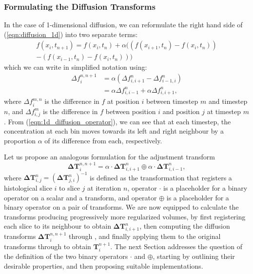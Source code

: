     \subsubsection{Formulating the Diffusion Transforms} %
    \label{ssub:formulating_the_diffusion_transforms}
      In the case of 1-dimensional diffusion, we can reformulate the right hand side of (\ref{eqn:diffusion_1d}) into two separate terms:
      \begin{equation}
        \begin{aligned}
          f(x_i, t_{n+1}) = f(x_i, t_n) + \alpha ((f(x_{i+1}, t_n) - f(x_i, t_n)) \\
          - (f(x_{i-1}, t_n) - f(x_i, t_n))) \label{eqn:1d_diffusion_operator}
        \end{aligned}
  	  \end{equation} 
  	  which we can write in simplified notation using:
      \begin{equation}
        \begin{aligned}
          \Delta f_i^{n,n+1} &= \alpha (\Delta f_{i,i+1}^n - \Delta f_{i-1,i}^n) \\
                             &= \alpha \Delta f_{i,i-1}^n + \alpha \Delta f_{i,i+1}^n, \label{eqn:simplified_expressions}
        \end{aligned}
      \end{equation}
      where $\Delta f_i^{m,n}$ is the difference in $f$ at position $i$ between timestep $m$ and timestep $n$, and $\Delta f_{i,j}^m$ is the difference in $f$ between position $i$ and position $j$ at timestep $m$. From (\ref{eqn:1d_diffusion_operator}), we can see that at each timestep, the concentration at each bin moves towards its left and right neighbour by a proportion $\alpha$ of its difference from each, respectively.
		
      Let us propose an analogous formulation for the adjustment transform
      \begin{equation}
        \mathbf{\Delta T}_i^{n,n+1} = \alpha \cdot \mathbf{\Delta T}_{i,i+1}^n \oplus \alpha \cdot \mathbf{\Delta T}_{i,i-1}^n, \label{eqn:transformational_placeholder}
      \end{equation}
      where $\mathbf{\Delta T}_{i,j}^n = (\mathbf{\Delta T}_{j,i}^n)^{-1}$ is defined as the transformation that registers a histological slice $i$ to slice $j$ at iteration $n$, operator $\cdot$ is a placeholder for a binary operator on a scalar and a transform, and operator $\oplus$ is a placeholder for a binary operator on a pair of transforms. We are now equipped to calculate the transforms producing progressively more regularized volumes, by first registering each slice to its neighbour to obtain $\mathbf{\Delta T}_{i,i+1}^n$, then computing the diffusion transforms $\mathbf{\Delta T}_i^{n,n+1}$ through , and finally applying them to the original transforms through  to obtain $\mathbf{T}_i^{n+1}$. The next Section addresses the question of the definition of the two binary operators $\cdot$ and $\oplus$, starting by outlining their desirable properties, and then proposing suitable implementations.
		
